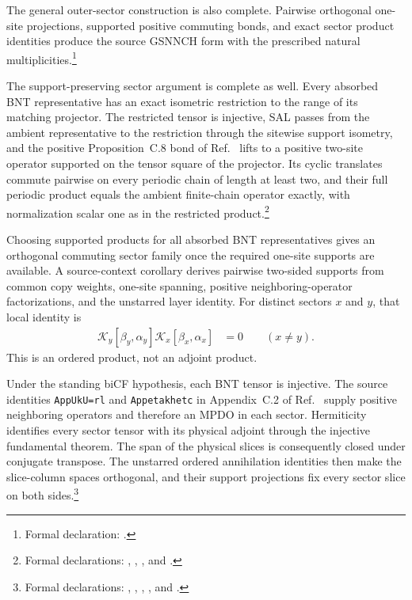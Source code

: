 \documentclass{article}
\begin{document}
The general outer-sector construction is also complete. Pairwise orthogonal
one-site projections, supported positive commuting bonds, and exact sector
product identities produce the source GSNNCH form with the prescribed natural
multiplicities.\footnote{\raggedright Formal declaration:
.}

The support-preserving sector argument is complete as well. Every absorbed BNT
representative has an exact isometric restriction to the range of its matching
projector. The restricted tensor is injective, SAL passes from the ambient
representative to the restriction through the sitewise support isometry, and
the positive Proposition~C.8 bond of
Ref.~\cite{Cirac2016MPDO_arXiv} lifts to a positive two-site operator supported
on the tensor square of the projector. Its cyclic translates commute pairwise
on every periodic chain of length at least two, and their full periodic product
equals the ambient finite-chain operator exactly, with normalization scalar
one as in the restricted product.\footnote{\raggedright Formal declarations:
,
,
, and
.}

Choosing supported products for all absorbed BNT representatives gives an
orthogonal commuting sector family once the required one-site supports are
available. A source-context corollary derives pairwise two-sided supports from
common copy weights, one-site spanning, positive neighboring-operator
factorizations, and the unstarred layer identity. For distinct sectors $x$ and
$y$, that local identity is
\begin{align}
    \mathcal{K}_y[\beta_y,\alpha_y]
    \mathcal{K}_x[\beta_x,\alpha_x]
        &=0
        \qquad (x\neq y).
    \label{eq:cpsv16_gsnnch_sector_decomposition_unstarred_layer_annihilation}
\end{align}
This is an ordered product, not an adjoint product.

Under the standing biCF hypothesis, each BNT tensor is injective. The source
identities \texttt{AppUkU=rl} and \texttt{Appetakhetc} in Appendix~C.2 of
Ref.~\cite{Cirac2016MPDO_arXiv} supply positive neighboring operators and
therefore an MPDO in each sector. Hermiticity identifies every sector tensor
with its physical adjoint through the injective fundamental theorem. The span
of the physical slices is consequently closed under conjugate transpose. The
unstarred ordered annihilation identities then make the slice-column spaces
orthogonal, and their support projections fix every sector slice on both
sides.\footnote{\raggedright Formal declarations:
,
,
,
, and
.}
\end{document}

